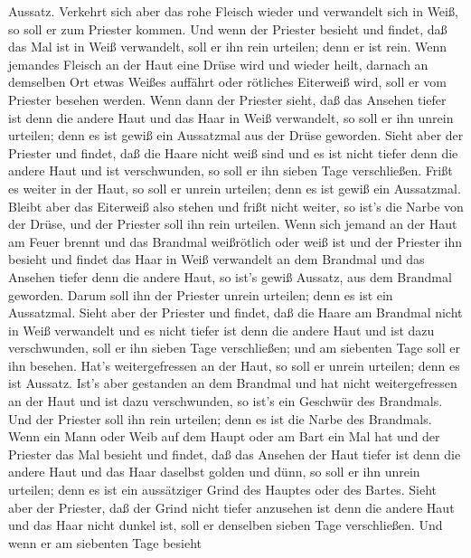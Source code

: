 Aussatz.  Verkehrt sich aber das rohe Fleisch wieder und
verwandelt sich in Weiß, so soll er zum Priester kommen. 
Und wenn der Priester besieht und findet, daß das Mal ist in Weiß
verwandelt, soll er ihn rein urteilen; denn er ist rein. 
Wenn jemandes Fleisch an der Haut eine Drüse wird und wieder heilt,
 darnach an demselben Ort etwas Weißes auffährt oder
rötliches Eiterweiß wird, soll er vom Priester besehen werden.
 Wenn dann der Priester sieht, daß das Ansehen tiefer ist
denn die andere Haut und das Haar in Weiß verwandelt, so soll er ihn
unrein urteilen; denn es ist gewiß ein Aussatzmal aus der Drüse
geworden.  Sieht aber der Priester und findet, daß die
Haare nicht weiß sind und es ist nicht tiefer denn die andere Haut und
ist verschwunden, so soll er ihn sieben Tage verschließen. 
Frißt es weiter in der Haut, so soll er unrein urteilen; denn es ist
gewiß ein Aussatzmal.  Bleibt aber das Eiterweiß also
stehen und frißt nicht weiter, so ist's die Narbe von der Drüse, und der
Priester soll ihn rein urteilen.  Wenn sich jemand an der
Haut am Feuer brennt und das Brandmal weißrötlich oder weiß ist
 und der Priester ihn besieht und findet das Haar in Weiß
verwandelt an dem Brandmal und das Ansehen tiefer denn die andere Haut,
so ist's gewiß Aussatz, aus dem Brandmal geworden. Darum soll ihn der
Priester unrein urteilen; denn es ist ein Aussatzmal. 
Sieht aber der Priester und findet, daß die Haare am Brandmal nicht in
Weiß verwandelt und es nicht tiefer ist denn die andere Haut und ist
dazu verschwunden, soll er ihn sieben Tage verschließen; 
und am siebenten Tage soll er ihn besehen. Hat's weitergefressen an der
Haut, so soll er unrein urteilen; denn es ist Aussatz. 
Ist's aber gestanden an dem Brandmal und hat nicht weitergefressen an
der Haut und ist dazu verschwunden, so ist's ein Geschwür des Brandmals.
Und der Priester soll ihn rein urteilen; denn es ist die Narbe des
Brandmals.  Wenn ein Mann oder Weib auf dem Haupt oder am
Bart ein Mal hat  und der Priester das Mal besieht und
findet, daß das Ansehen der Haut tiefer ist denn die andere Haut und das
Haar daselbst golden und dünn, so soll er ihn unrein urteilen; denn es
ist ein aussätziger Grind des Hauptes oder des Bartes. 
Sieht aber der Priester, daß der Grind nicht tiefer anzusehen ist denn
die andere Haut und das Haar nicht dunkel ist, soll er denselben sieben
Tage verschließen.  Und wenn er am siebenten Tage besieht

